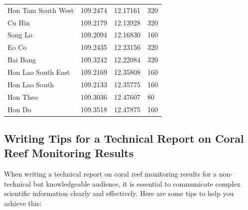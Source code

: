 \documentclass[
  letterpaper,
  DIV=11,
  numbers=noendperiod]{scrartcl}
\begin{document}
\begin{longtable}[]{@{}llll@{}}
Hon Tam South West & 109.2474 & 12.17161 & 320 \\
Cu Hin & 109.2179 & 12.13928 & 320 \\
Song Lo & 109.2094 & 12.16830 & 160 \\
Eo Co & 109.2435 & 12.23156 & 320 \\
Bai Bang & 109.3242 & 12.22084 & 320 \\
Hon Lao South East & 109.2169 & 12.35808 & 160 \\
Hon Lao South & 109.2133 & 12.35775 & 160 \\
Hon Theo & 109.3036 & 12.47607 & 80 \\
Hon Do & 109.3518 & 12.47875 & 160 \\

\end{longtable}

\pagebreak

\subsection{Writing Tips for a Technical Report on Coral Reef Monitoring
Results}\label{writing-tips-for-a-technical-report-on-coral-reef-monitoring-results}

When writing a technical report on coral reef monitoring results for a
non-technical but knowledgeable audience, it is essential to communicate
complex scientific information clearly and effectively. Here are some
tips to help you achieve this:
\end{document}
